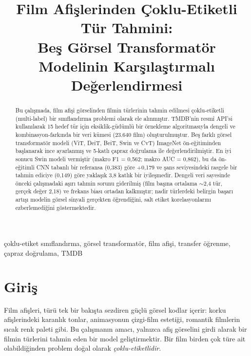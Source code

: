 \documentclass[conference]{IEEEtran}
\begin{document}
\title{Film Afişlerinden Çoklu-Etiketli Tür Tahmini:\\
Beş Görsel Transformatör Modelinin Karşılaştırmalı Değerlendirmesi}

\author{
}

\maketitle

\begin{abstract}
Bu çalışmada, film afişi görselinden filmin türlerinin tahmin edilmesi
çoklu-etiketli (multi-label) bir sınıflandırma problemi olarak ele alınmıştır.
TMDB'nin resmî API'si kullanılarak 15 hedef tür için eksiklik-güdümlü bir
örnekleme algoritmasıyla dengeli ve kombinasyon-farkında bir veri kümesi
(23.640 film) oluşturulmuştur. Beş farklı görsel transformatör modeli
(ViT, DeiT, BeiT, Swin ve CvT) ImageNet ön-eğitiminden başlanarak ince
ayarlanmış ve 5-katlı çapraz doğrulama ile değerlendirilmiştir. En iyi sonucu
Swin modeli vermiştir (makro F1 = 0,562; makro AUC = 0,862), bu da ön-eğitimli
CNN tabanlı bir referansa (0,383) göre +0,179 ve şans seviyesindeki rasgele bir
tahmin ediciye (0,149) göre yaklaşık 3,8 katlık bir iyileşmedir. Dengeli veri
sayesinde önceki çalışmadaki aşırı tahmin sorunu giderilmiş (film başına ortalama
$\sim$2,4 tür, gerçek değer 2,18) ve frekans biası ortadan kalkmıştır; nadir
türlerdeki belirgin başarı artışı modelin görsel sinyali gerçekten öğrendiğini,
salt etiket korelasyonlarını ezberlemediğini göstermektedir.
\end{abstract}

\begin{IEEEkeywords}
çoklu-etiket sınıflandırma, görsel transformatör, film afişi, transfer öğrenme,
çapraz doğrulama, TMDB
\end{IEEEkeywords}

\section{Giriş}
Film afişleri, türü tek bir bakışta sezdiren güçlü görsel kodlar içerir: korku
afişlerindeki karanlık tonlar, animasyonun çizgi-film estetiği, romantik
filmlerin sıcak renk paleti gibi. Bu çalışmanın amacı, yalnızca afiş görselini
girdi alarak bir filmin türlerini tahmin eden bir model geliştirmektir. Bir film
birden çok türe ait olabildiğinden problem doğal olarak \textit{çoklu-etiketlidir}.
\end{document}

